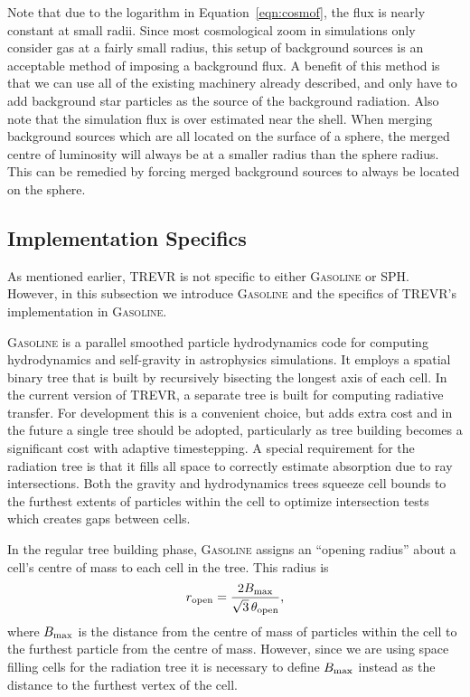 \documentclass[fleq,usenatbib]{mnras}
\newcommand{\acro}{TREVR}
\newcommand{\tO}{\theta_{\rm open}}
\begin{document}
{Note that due to the logarithm in Equation~\ref{eqn:cosmof}, the flux is 
nearly constant at small radii. Since most cosmological zoom in simulations 
only consider gas at a fairly small radius, this setup of background sources 
is an acceptable method of imposing a background flux. A benefit of this 
method is that we can use all of the existing machinery already described, and 
only have to add background star particles as the source of the 
background radiation. Also note that the simulation flux is over estimated 
near the shell.  When merging 
background sources which are all located on the surface of a sphere, the 
merged centre of luminosity will always be at a smaller radius than the sphere 
radius. This can be remedied by forcing merged background sources to always be 
located on the sphere. 

\subsection{Implementation Specifics}\label{sec:specs}
As mentioned earlier, \acro{} is not specific to either \textsc{Gasoline} or 
SPH.  However, in this subsection we 
introduce \textsc{Gasoline} and the specifics of \acro{}'s implementation in 
\textsc{Gasoline}.

\textsc{Gasoline} is a parallel smoothed particle hydrodynamics code for 
computing hydrodynamics and self-gravity in astrophysics simulations. It 
employs a spatial binary tree that is built by recursively bisecting the 
longest axis of each cell. In the current version of \acro{}, a separate tree 
is built for computing radiative transfer. For development this is a 
convenient choice, but adds extra cost and in the future a single tree
should be adopted, particularly as tree building becomes a significant cost
with adaptive timestepping.
A special requirement for the radiation tree
is that it fills all space to correctly estimate absorption due to ray intersections.
Both the gravity and hydrodynamics trees 
squeeze cell bounds to the furthest
extents of particles within the cell to optimize intersection tests which creates
gaps between cells.

In the regular tree building phase, \textsc{Gasoline} assigns an ``opening 
radius'' about a cell's centre of mass to each cell in the tree. This radius is
\begin{equation}
r_{\rm open} = \frac{2 B_{\rm max}}{\sqrt{3}\, \tO},
\end{equation}
where $B_{\rm max}$ is the  distance from the centre of mass of particles 
within the cell to the furthest particle from the centre of mass. However, 
since we are using space filling cells for the radiation tree it is necessary 
to define $B_{\rm max}$ instead as the distance to the furthest vertex of the 
cell.

}
\end{document}
